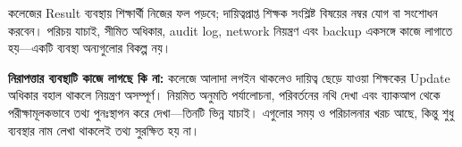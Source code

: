 


কলেজের Result ব্যবস্থায় শিক্ষার্থী নিজের ফল পড়বে; দায়িত্বপ্রাপ্ত শিক্ষক সংশ্লিষ্ট বিষয়ের নম্বর যোগ বা সংশোধন করবেন। পরিচয় যাচাই, সীমিত অধিকার, audit log, network নিয়ন্ত্রণ এবং backup একসঙ্গে কাজে লাগাতে হয়—একটি ব্যবস্থা অন্যগুলোর বিকল্প নয়।

\textbf{নিরাপত্তার ব্যবস্থাটি কাজে লাগছে কি না:} কলেজে আলাদা লগইন থাকলেও দায়িত্ব ছেড়ে যাওয়া শিক্ষকের Update অধিকার বহাল থাকলে নিয়ন্ত্রণ অসম্পূর্ণ। নিয়মিত অনুমতি পর্যালোচনা, পরিবর্তনের নথি দেখা এবং ব্যাকআপ থেকে পরীক্ষামূলকভাবে তথ্য পুনঃস্থাপন করে দেখা—তিনটি ভিন্ন যাচাই। এগুলোর সময় ও পরিচালনার খরচ আছে, কিন্তু শুধু ব্যবস্থার নাম লেখা থাকলেই তথ্য সুরক্ষিত হয় না।














